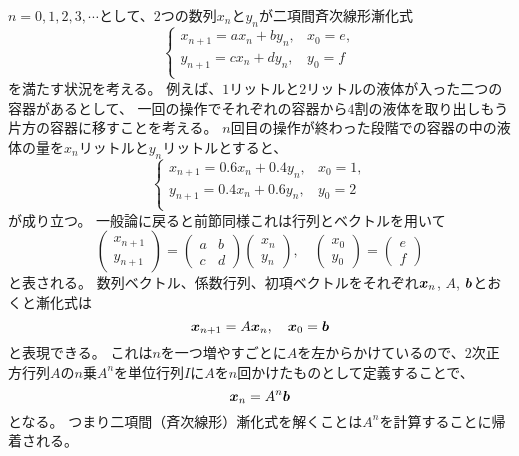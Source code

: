 $n = 0, 1, 2, 3, \cdots$として、$2$つの数列$x_n$と$y_n$が二項間斉次線形漸化式
$$
\begin{cases}
x_{n+1} = a x_n+b y_n, & x_0 = e, \\
y_{n+1} = c x_n+d y_n, & y_0 = f \\
\end{cases}
$$
を満たす状況を考える。
例えば、$1$リットルと$2$リットルの液体が入った二つの容器があるとして、
一回の操作でそれぞれの容器から$4$割の液体を取り出しもう片方の容器に移すことを考える。
$n$回目の操作が終わった段階での容器の中の液体の量を$x_n$リットルと$y_n$リットルとすると、
$$
\begin{cases}
x_{n+1} = 0.6 x_n+0.4 y_n, & x_0 = 1, \\
y_{n+1} = 0.4 x_n+0.6 y_n, & y_0 = 2 \\
\end{cases}
$$
が成り立つ。
一般論に戻ると前節同様これは行列とベクトルを用いて
$$
\begin{pmatrix}x_{n+1} \\ y_{n+1}\end{pmatrix}
= \begin{pmatrix}a & b \\ c & d\end{pmatrix}\begin{pmatrix}x_n \\ y_n\end{pmatrix},
\quad \begin{pmatrix}x_0 \\ y_0\end{pmatrix} = \begin{pmatrix}e \\ f\end{pmatrix}
$$
と表される。
数列ベクトル、係数行列、初項ベクトルをそれぞれ$\vb*{x}_n$, $A$, $\vb*{b}$とおくと漸化式は
$$
\vb*{x}_{n+1} = A \vb*{x}_n, \quad \vb*{x}_0 = \vb*{b}
$$
と表現できる。
これは$n$を一つ増やすごとに$A$を左からかけているので、$2$次正方行列$A$の$n$乗$A^n$を単位行列$I$に$A$を$n$回かけたものとして定義することで、
$$
\vb*{x}_n = A^n \vb*{b}
$$
となる。
つまり二項間（斉次線形）漸化式を解くことは$A^n$を計算することに帰着される。

